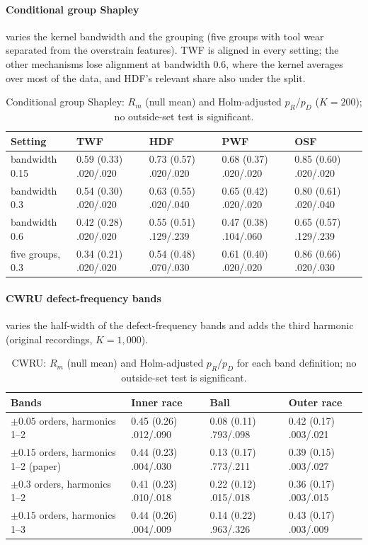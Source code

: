 \documentclass[10pt]{article}
\begin{document}
\paragraph{Conditional group Shapley}  varies the kernel bandwidth and the grouping (five groups with tool wear separated from the overstrain features). TWF is aligned in every setting; the other mechanisms lose alignment at bandwidth 0.6, where the kernel averages over most of the data, and HDF's relevant share also under the split.

\begin{table}[htbp]
\centering
\caption{Conditional group Shapley: $R_m$ (null mean) and Holm-adjusted $p_R$/$p_D$ ($K=200$); no outside-set test is significant.}
\label{tab:cond}
\small
\begin{tabular}{@{}lllll@{}}
\toprule
Setting & TWF & HDF & PWF & OSF \\
\midrule
bandwidth 0.15 & 0.59 (0.33) .020/.020 & 0.73 (0.57) .020/.020 & 0.68 (0.37) .020/.020 & 0.85 (0.60) .020/.020 \\
bandwidth 0.3 & 0.54 (0.30) .020/.020 & 0.63 (0.55) .020/.040 & 0.65 (0.42) .020/.020 & 0.80 (0.61) .020/.040 \\
bandwidth 0.6 & 0.42 (0.28) .020/.020 & 0.55 (0.51) .129/.239 & 0.47 (0.38) .104/.060 & 0.65 (0.57) .129/.239 \\
five groups, 0.3 & 0.34 (0.21) .020/.020 & 0.54 (0.48) .070/.030 & 0.61 (0.40) .020/.020 & 0.86 (0.66) .020/.030 \\
\bottomrule
\end{tabular}
\end{table}

\paragraph{CWRU defect-frequency bands}  varies the half-width of the defect-frequency bands and adds the third harmonic (original recordings, $K=1{,}000$).

\begin{table}[htbp]
\centering
\caption{CWRU: $R_m$ (null mean) and Holm-adjusted $p_R$/$p_D$ for each band definition; no outside-set test is significant.}
\label{tab:bands}
\small
\begin{tabular}{@{}llll@{}}
\toprule
Bands & Inner race & Ball & Outer race \\
\midrule
$\pm0.05$ orders, harmonics 1--2 & 0.45 (0.26) .012/.090 & 0.08 (0.11) .793/.098 & 0.42 (0.17) .003/.021 \\
$\pm0.15$ orders, harmonics 1--2 (paper) & 0.44 (0.23) .004/.030 & 0.13 (0.17) .773/.211 & 0.39 (0.15) .003/.027 \\
$\pm0.3$ orders, harmonics 1--2 & 0.41 (0.23) .010/.018 & 0.22 (0.12) .015/.018 & 0.36 (0.17) .003/.015 \\
$\pm0.15$ orders, harmonics 1--3 & 0.44 (0.26) .004/.009 & 0.14 (0.22) .963/.326 & 0.43 (0.17) .003/.009 \\
\bottomrule
\end{tabular}
\end{table}
\end{document}
